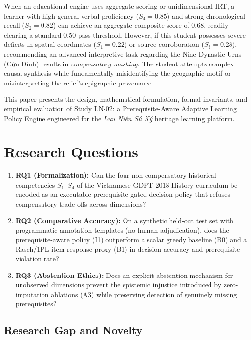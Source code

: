 \documentclass[11pt,a4paper]{article}
\begin{document}
When an educational engine uses aggregate scoring or unidimensional IRT, a learner with high general verbal proficiency ($S_4 = 0.85$) and strong chronological recall ($S_2 = 0.82$) can achieve an aggregate composite score of $0.68$, readily clearing a standard $0.50$ pass threshold. However, if this student possesses severe deficits in spatial coordinates ($S_1 = 0.22$) or source corroboration ($S_3 = 0.28$), recommending an advanced interpretive task regarding the Nine Dynastic Urns (Cửu Đỉnh) results in \textit{compensatory masking}. The student attempts complex causal synthesis while fundamentally misidentifying the geographic motif or misinterpreting the relief's epigraphic provenance.

This paper presents the design, mathematical formulation, formal invariants, and empirical evaluation of Study LN-02: a Prerequisite-Aware Adaptive Learning Policy Engine engineered for the \textit{Lưu Niên Sứ Ký} heritage learning platform.

\section{Research Questions}

\begin{enumerate}[label=\textbf{RQ\arabic*}, leftmargin=2.4em]
    \item \textbf{RQ1 (Formalization):} Can the four non-compensatory historical competencies $S_1$--$S_4$ of the Vietnamese GDPT 2018 History curriculum \cite{moet2018gdpt} be encoded as an executable prerequisite-gated decision policy that refuses compensatory trade-offs across dimensions?
    \item \textbf{RQ2 (Comparative Accuracy):} On a synthetic held-out test set with programmatic annotation templates (no human adjudication), does the prerequisite-aware policy (I1) outperform a scalar greedy baseline (B0) and a Rasch/1PL item-response proxy (B1) in decision accuracy and prerequisite-violation rate?
    \item \textbf{RQ3 (Abstention Ethics):} Does an explicit abstention mechanism for unobserved dimensions prevent the epistemic injustice introduced by zero-imputation ablations (A3) while preserving detection of genuinely missing prerequisites?
\end{enumerate}

\subsection{Research Gap and Novelty}
\end{document}
